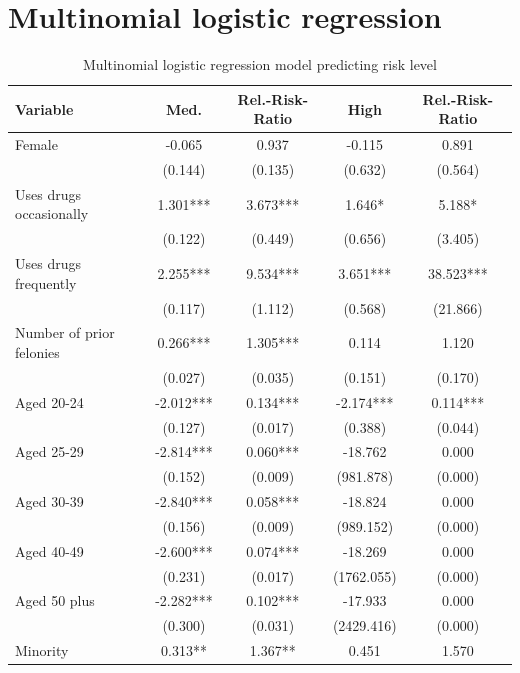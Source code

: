 \section{Multinomial logistic regression}

\begin{table}[htbp]\centering
 \caption{Multinomial logistic regression model predicting risk level \label{tab:recdmul}}
 \begin{tabular}{lcccc}
\hline
Variable      &    Med. & Rel.-Risk-Ratio &    High & Rel.-Risk-Ratio  \\
\hline
Female   &   -0.065  &    0.937  &   -0.115  &    0.891  \\
      &   (0.144)  &   (0.135)  &   (0.632)  &   (0.564)  \\
Uses drugs occasionally   &    1.301***&    3.673***&    1.646* &    5.188* \\
      &   (0.122)  &   (0.449)  &   (0.656)  &   (3.405)  \\
Uses drugs frequently   &    2.255***&    9.534***&    3.651***&   38.523***\\
      &   (0.117)  &   (1.112)  &   (0.568)  &  (21.866)  \\
Number of prior felonies    &    0.266***&    1.305***&    0.114  &    1.120  \\
      &   (0.027)  &   (0.035)  &   (0.151)  &   (0.170)  \\
Aged 20-24   &   -2.012***&    0.134***&   -2.174***&    0.114***\\
      &   (0.127)  &   (0.017)  &   (0.388)  &   (0.044)  \\
Aged 25-29   &   -2.814***&    0.060***&   -18.762  &    0.000  \\
      &   (0.152)  &   (0.009)  &  (981.878)  &   (0.000)  \\
Aged 30-39   &   -2.840***&    0.058***&   -18.824  &    0.000  \\
      &   (0.156)  &   (0.009)  &  (989.152)  &   (0.000)  \\
Aged 40-49   &   -2.600***&    0.074***&   -18.269  &    0.000  \\
      &   (0.231)  &   (0.017)  & (1762.055)  &   (0.000)  \\
Aged 50 plus   &   -2.282***&    0.102***&   -17.933  &    0.000  \\
      &   (0.300)  &   (0.031)  & (2429.416)  &   (0.000)  \\
Minority    &    0.313** &    1.367** &    0.451  &    1.570  \\

\end{tabular}
\end{table}
